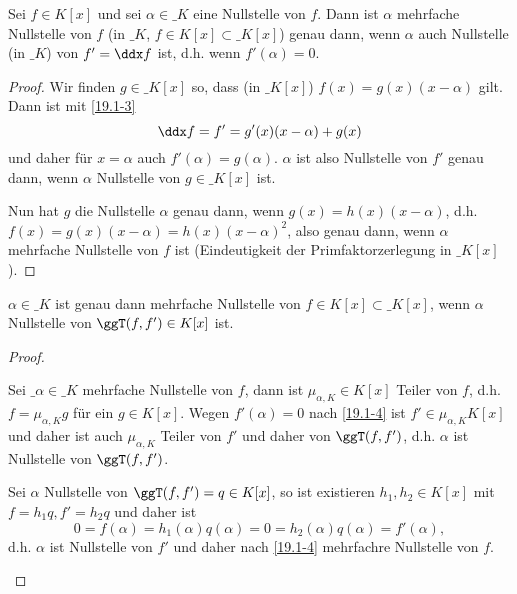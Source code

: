 \begin{lem} \label{19.1-4}
	Sei $f \in K[x]$ und sei $\alpha \in \_K$ eine Nullstelle von $f$.
	Dann ist $\alpha$ mehrfache Nullstelle von $f$ (in $\_K$, $f \in K[x] \subset \_K[x]$) genau dann, wenn $\alpha$ auch Nullstelle (in $\_K$) von $f' = \ddx f$ ist, d.h. wenn $f'(\alpha) = 0$.
	\begin{proof}
		Wir finden $g \in \_K[x]$ so, dass (in $\_K[x]$) $f(x) = g(x) (x - \alpha)$ gilt.
		Dann ist mit \ref{19.1-3}
		\[
			\ddx f = f' = g'(x)(x-\alpha) + g(x)
		\]
		und daher für $x = \alpha$ auch $f'(\alpha) = g(\alpha)$.
		$\alpha$ ist also Nullstelle von $f'$ genau dann, wenn $\alpha$ Nullstelle von $g \in \_K[x]$ ist.

		Nun hat $g$ die Nullstelle $\alpha$ genau dann, wenn $g(x) = h(x)(x-\alpha)$, d.h. $f(x) = g(x)(x-\alpha) = h(x) (x-\alpha)^2$, also genau dann, wenn $\alpha$ mehrfache Nullstelle von $f$ ist (Eindeutigkeit der Primfaktorzerlegung in $\_K[x]$).
	\end{proof}
\end{lem}

\begin{kor} \label{19.1-5}
	$\alpha \in \_K$ ist genau dann mehrfache Nullstelle von $f \in K[x] \subset \_K[x]$, wenn $\alpha$ Nullstelle von $\ggT(f, f') \in K[x]$ ist.
	\begin{proof}
		\begin{segnb}{\ProofImplication}
			Sei $\_{\alpha} \in \_{K}$ mehrfache Nullstelle von $f$, dann ist $\mu_{\alpha,K} \in K[x]$ Teiler von $f$, d.h. $f = \mu_{\alpha, K} g$ für ein $g \in K[x]$.
			Wegen $f'(\alpha) = 0$ nach \ref{19.1-4} ist $f' \in \mu_{\alpha, K} K[x]$ und daher ist auch $\mu_{\alpha, K}$ Teiler von $f'$ und daher von $\ggT(f, f')$, d.h. $\alpha$ ist Nullstelle von $\ggT(f, f')$.
		\end{segnb}
		\begin{segnb}{\ProofImplication*}
			Sei $\alpha$ Nullstelle von $\ggT(f, f') = q \in K[x]$, so ist existieren $h_1, h_2 \in K[x]$ mit $f = h_1 q, f' = h_2 q$ und daher ist
			\[
				0 = f(\alpha) = h_1(\alpha) q(\alpha)
				= 0 = h_2(\alpha) q(\alpha)
				= f'(\alpha),
			\]
			d.h. $\alpha$ ist Nullstelle von $f'$ und daher nach \ref{19.1-4} mehrfachre Nullstelle von $f$.
		\end{segnb}
	\end{proof}
\end{kor}

